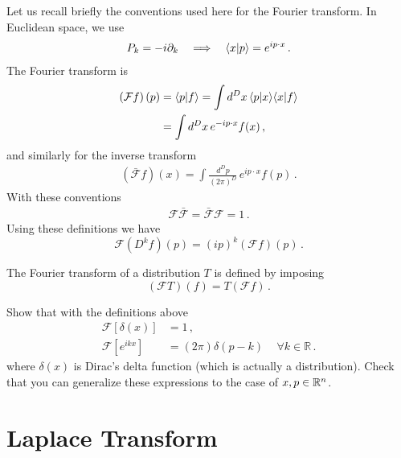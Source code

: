 Let us recall briefly the conventions used here for the Fourier transform. In
Euclidean space, we use
\begin{align}
    P_k = -i \partial_k 
    \quad \Longrightarrow \quad 
    \langle x | p \rangle = e^{i p\cdot x}\, .
\end{align}
The Fourier transform is 
\begin{align}
    \left(\mathcal{F}f\right)(p) 
        &= \langle p | f \rangle = \int d^Dx\, \langle p | x \rangle \langle x | f \rangle \\
        &= \int d^Dx\, e^{-i p\cdot x} f(x)\, ,
\end{align}
and similarly for the inverse transform
\begin{align}
    \left(\bar{\mathcal{F}} f\right)(x) = 
    \int \frac{d^Dp}{(2\pi)^D}\, e^{i p\cdot x} 
    f(p)\, .
\end{align}
With these conventions
\begin{align}
    \mathcal{F} \bar{\mathcal{F}} =
    \bar{\mathcal{F}} \mathcal{F} = 
    1\, .
\end{align}
Using these definitions we have
\begin{equation}
    \label{eq:Fdkf}
    \mathcal{F}\left(D^kf\right)(p) = 
        \left(ip\right)^k \left(\mathcal{F}f\right)(p)\, .
\end{equation}

\begin{Def}
    The Fourier transform of a distribution $T$ is defined by imposing
    \begin{equation}
        \label{eq:FTDistrDef}
        \left(\mathcal{F}T\right) (f) = 
        T\left(\mathcal{F}f\right)\, .
    \end{equation}
\end{Def}

\begin{Ex}
    Show that with the definitions above
    \begin{align}
        \mathcal{F}[\delta(x)] 
            &= 1\, ,    \\
        \mathcal{F}[e^{ikx}] 
            &= (2\pi) \delta(p-k)\, \quad \forall k \in \mathbb{R}\, .
    \end{align}
    where $\delta(x)$ is Dirac's delta function (which is actually a
    distribution). Check that you can generalize these expressions to the case
    of $x,p \in \mathbb{R}^n$.
\end{Ex}

\section{Laplace Transform}
\label{sec:LaplaceTransf}


